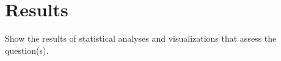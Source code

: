 \chapter{Results}
\label{sec:results}

Show the results of statistical analyses and visualizations that assess the question(s).